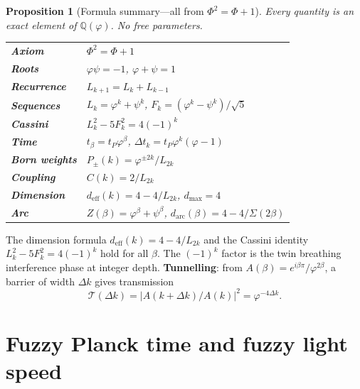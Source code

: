 \documentclass[12pt,a4paper]{article}
\newtheorem{proposition}[theorem]{Proposition}
\begin{document}
\begin{proposition}[Formula summary---all from $\Phi^2 = \Phi + 1$]
\label{prop:formula-summary}
Every quantity is an exact element of $\mathbb{Q}(\varphi)$. No free parameters.
\begin{center}
\begin{tabular}{ll}
\textbf{Axiom} & $\Phi^2 = \Phi + 1$ \\
\textbf{Roots} & $\varphi\psi = -1$, $\varphi + \psi = 1$ \\
\textbf{Recurrence} & $L_{k+1} = L_k + L_{k-1}$ \\
\textbf{Sequences} & $L_k = \varphi^k + \psi^k$, $F_k = (\varphi^k - \psi^k)/\sqrt{5}$ \\
\textbf{Cassini} & $L_k^2 - 5F_k^2 = 4(-1)^k$ \\
\textbf{Time} & $t_\beta = t_P\varphi^\beta$, $\Delta t_k = t_P\varphi^k(\varphi-1)$ \\
\textbf{Born weights} & $P_\pm(k) = \varphi^{\pm 2k}/L_{2k}$ \\
\textbf{Coupling} & $C(k) = 2/L_{2k}$ \\
\textbf{Dimension} & $d_{\mathrm{eff}}(k) = 4 - 4/L_{2k}$, $d_{\max} = 4$ \\
\textbf{Arc} & $Z(\beta) = \varphi^\beta + \psi^\beta$, $d_{\mathrm{arc}}(\beta) = 4 - 4/\Sigma(2\beta)$
\end{tabular}
\end{center}
\end{proposition}

\medskip
\noindent The dimension formula $d_{\mathrm{eff}}(k) = 4 - 4/L_{2k}$ and the Cassini identity $L_k^2 - 5F_k^2 = 4(-1)^k$ hold for all $\beta$. The $(-1)^k$ factor is the twin breathing interference phase at integer depth. \textbf{Tunnelling}: from $A(\beta) = e^{i\beta\pi}/\varphi^{2\beta}$, a barrier of width $\Delta k$ gives transmission
\begin{equation}
\mathcal{T}(\Delta k) = |A(k+\Delta k)/A(k)|^2 = \varphi^{-4\Delta k}. \label{eq:tunnel}
\end{equation}

\section{Fuzzy Planck time and fuzzy light speed}
\label{sec:planck-convergence}
\end{document}
